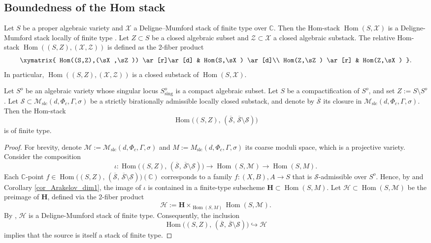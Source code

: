 \documentclass[11pt,letterpaper]{amsart}
\numberwithin{equation}{section}
\begin{document}
    \subsection{Boundedness of the Hom stack}
    Let $S$ be a proper algebraic variety and $\mathcal{X}$ a Deligne–Mumford stack of finite type over $\mathbb{C}$. Then the Hom-stack $\operatorname{Hom}(S,\mathcal{X})$ is a Deligne-Mumford stack locally of finite type \cite[Theorem 1.1]{Olsson2006}. Let $Z \subset S$ be a closed algebraic subset and $\mathcal{Z} \subset \mathcal{X}$ a closed algebraic substack. The relative Hom-stack $\operatorname{Hom}((S,Z),(\mathcal{X},\mathcal{Z}))$ is defined as the 2-fiber product  
    $$\xymatrix{
    	Hom((S,Z),(\sX,\sZ)) \ar[r]\ar[d] & Hom(S,\sX) \ar[d]\\
    	Hom(Z,\sZ) \ar[r] & Hom(Z,\sX)
    }.$$ 
    In particular, $\operatorname{Hom}((S,Z),(\mathcal{X},\mathcal{Z}))$ is a closed substack of $\operatorname{Hom}(S,\mathcal{X})$.      
    \begin{thm}\label{thm_main_Hom_proof}  
    	Let $S^o$ be an algebraic variety whose singular locus $S^o_{\mathrm{sing}}$ is a compact algebraic subset. Let $S$ be a compactification of $S^o$, and set $Z := S \setminus S^o$. Let $\mathcal{S} \subset \mathcal{M}_{\mathrm{slc}}(d, \Phi_c, \Gamma, \sigma)$ be a strictly birationally admissible locally closed substack, and denote by $\overline{\mathcal{S}}$ its closure in $\mathcal{M}_{\mathrm{slc}}(d, \Phi_c, \Gamma, \sigma)$. Then the Hom-stack  
    	\[
    	\operatorname{Hom}\big((S,Z),\,(\overline{\mathcal{S}},\,\overline{\mathcal{S}} \setminus \mathcal{S})\big)
    	\]  
    	is of finite type.
    \end{thm}
    \begin{proof}
    	For brevity, denote $\mathcal{M} := \mathcal{M}_{\mathrm{slc}}(d, \Phi_c, \Gamma, \sigma)$ and $M := M_{\mathrm{slc}}(d, \Phi_c, \Gamma, \sigma)$ its coarse moduli space, which is a projective variety. Consider the composition  
    	\[
    	\iota \colon \operatorname{Hom}\big((S,Z),\,(\overline{\mathcal{S}},\,\overline{\mathcal{S}} \setminus \mathcal{S})\big) \to \operatorname{Hom}(S,\mathcal{M}) \to \operatorname{Hom}(S,M).
    	\]  
    	Each $\mathbb{C}$-point $f \in \operatorname{Hom}\big((S,Z),\,(\overline{\mathcal{S}},\,\overline{\mathcal{S}} \setminus \mathcal{S})\big)(\mathbb{C})$ corresponds to a family $f \colon (X,B),A \to S$ that is $\mathcal{S}$-admissible over $S^o$. Hence, by \cite[Proposition 2.6]{Kovacs2011} and Corollary \ref{cor_Arakelov_dim1}, the image of $\iota$ is contained in a finite-type subscheme $\mathbf{H} \subset \operatorname{Hom}(S,M)$. Let $\mathcal{H} \subset \operatorname{Hom}(S,\mathcal{M})$ be the preimage of $\mathbf{H}$, defined via the 2-fiber product  
    	\[
    	\mathcal{H} := \mathbf{H} \times_{\operatorname{Hom}(S,M)} \operatorname{Hom}(S,\mathcal{M}).
    	\]  
    	By \cite[Theorem 1.1]{Olsson2007}, $\mathcal{H}$ is a Deligne-Mumford stack of finite type. Consequently, the inclusion  
    	\[
    	\operatorname{Hom}\big((S,Z),\,(\overline{\mathcal{S}},\,\overline{\mathcal{S}} \setminus \mathcal{S})\big) \hookrightarrow \mathcal{H}
    	\]  
    	implies that the source is itself a stack of finite type.
    \end{proof}
	
	
\end{document}
